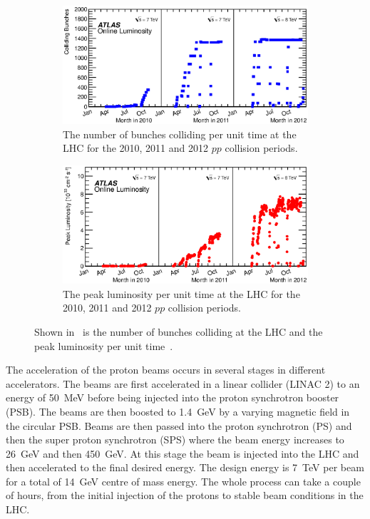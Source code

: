 \begin{figure}[htbp]
  \centering
    \begin{subfigure}[b]{0.95\textwidth}
      \includegraphics[width=\textwidth]{PartDetector/Plots/BunchesCollidingPerTime.eps}
      \caption{The number of bunches colliding per unit time at the LHC for the 2010, 2011 and 2012 $pp$ collision periods.}
      \label{fig:DetectorBunchesColliding}
    \end{subfigure}
  
    \begin{subfigure}[b]{0.95\textwidth}
      \includegraphics[width=\textwidth]{PartDetector/Plots/PeakLuminosityVsTime.eps}
      \caption{The peak luminosity per unit time at the LHC for the 2010, 2011 and 2012 $pp$ collision periods.}
      \label{fig:DetectorPeakLumi}
    \end{subfigure}
    \caption{Shown in~ is the number of bunches colliding at the LHC and  the peak luminosity per unit time~\cite{Detector:LuminosityResults}.}
  \label{fig:DetectorPerformance}
\end{figure}

The acceleration of the proton beams occurs in several stages in different accelerators. The beams are first accelerated in a linear collider (LINAC 2) to an energy of \SI{50}{\MeV} before being injected into the proton synchrotron booster (PSB). The beams are then boosted to \SI{1.4}{\GeV} by a varying magnetic field in the circular PSB. Beams are then passed into the proton synchrotron (PS) and then the super proton synchrotron (SPS) where the beam energy increases to \SI{26}{\GeV} and then \SI{450}{\GeV}. At this stage the beam is injected into the LHC and then accelerated to the final desired energy. The design energy is \SI{7}{\TeV} per beam for a total of \SI{14}{\GeV} centre of mass energy. The whole process can take a couple of hours, from the initial injection of the protons to stable beam conditions in the LHC.

